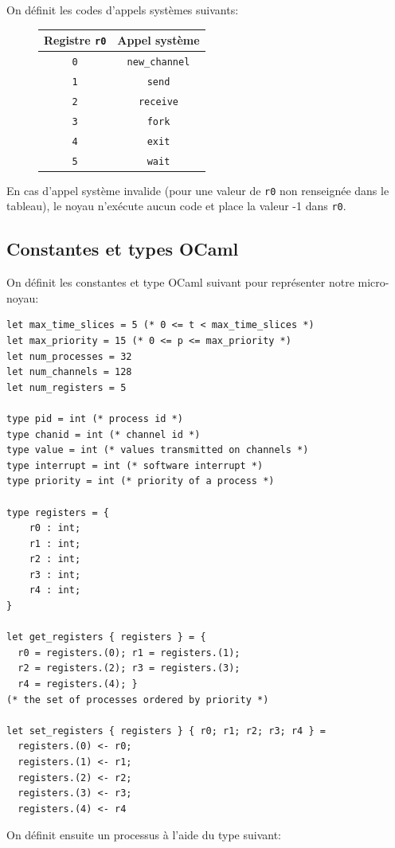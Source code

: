 \documentclass[french, toc]{../cs-classes/cs-classes}
\begin{document}
On définit les codes d'appels systèmes suivants:
\begin{figure}[!ht]
    \centering
    \begin{tabular}{c c}
        Registre \texttt{r0} & Appel système \\
        \hline
        \texttt{0} & \texttt{new\_channel} \\
        \texttt{1} & \texttt{send} \\
        \texttt{2} & \texttt{receive} \\
        \texttt{3} & \texttt{fork} \\
        \texttt{4} & \texttt{exit} \\
        \texttt{5} & \texttt{wait} \\
    \end{tabular}
\end{figure}
En cas d'appel système invalide (pour une valeur de \texttt{r0} non renseignée dans le tableau), le noyau n'exécute aucun code et place la valeur -1 dans \texttt{r0}.

\subsection{Constantes et types OCaml}
On définit les constantes et type OCaml suivant pour représenter notre micro-noyau:
\begin{verbatim}
let max_time_slices = 5 (* 0 <= t < max_time_slices *)
let max_priority = 15 (* 0 <= p <= max_priority *)
let num_processes = 32
let num_channels = 128
let num_registers = 5

type pid = int (* process id *)
type chanid = int (* channel id *)
type value = int (* values transmitted on channels *)
type interrupt = int (* software interrupt *)
type priority = int (* priority of a process *)

type registers = {
    r0 : int;
    r1 : int;
    r2 : int;
    r3 : int;
    r4 : int; 
}

let get_registers { registers } = {
  r0 = registers.(0); r1 = registers.(1);
  r2 = registers.(2); r3 = registers.(3);
  r4 = registers.(4); }
(* the set of processes ordered by priority *)

let set_registers { registers } { r0; r1; r2; r3; r4 } =
  registers.(0) <- r0; 
  registers.(1) <- r1;
  registers.(2) <- r2; 
  registers.(3) <- r3;
  registers.(4) <- r4
\end{verbatim}

\noindent On définit ensuite un processus à l'aide du type suivant:
\end{document}
